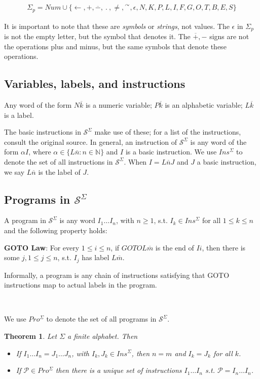 \documentclass[a4paper, 12pt]{article}
\newtheorem{theorem}{Theorem}
\newtheorem{theorem}{Theorem}
\begin{document}
\begin{align*}
    \Sigma_p = Num \cup \{ \leftarrow, +, \overline{-}, ~ . ~, \neq, {}^{\curvearrowright},
    \epsilon, N, K, P, L, I, F, G, O, T, B, E, S \}
\end{align*}

It is important to note that these are \textit{symbols} or \textit{strings}, not
values. The $\epsilon$ in $\Sigma_p$ is not the empty letter, but the symbol
that denotes it. The $\overline{+}, -$ signs are not the operations plus and
minus, but the same symbols that denote these operations. 

\subsection{Variables, labels, and instructions}

Any word of the form $N \overline{k}$ is a numeric variable; $P \overline{k}$ is
an alphabetic variable; $L \overline{k}$ is a label.

The basic instructions in $\mathcal{S}^{\Sigma}$ make use of these; for a list
of the instructions, consult the original source. In general, an instruction of
$\mathcal{S}^{\Sigma}$ is any word of the form $\alpha I$, where $\alpha \in \{L
\overline{n}: n \in \mathbb{N}\}$ and $I$ is a basic instruction. We use
$Ins^{\Sigma}$ to denote the set of all instructions in $\mathcal{S}^{\Sigma}$.
When $I = L \overline{n} J$ and $J$ a basic instruction, we say $L \overline{n}$
is the label of $J$.

\subsection{Programs in $\mathcal{S}^{\Sigma}$}

A program in $\mathcal{S}^{\Sigma}$ is any word $I_1 \ldots I_n$, with $n \geq
1$, s.t. $I_k \in Ins^{\Sigma}$ for all $1 \leq k \leq n$ and the following
property holds:

\textbf{GOTO Law}: For every $1 \leq i \leq n$, if $GOTOL \overline{m}$ is
the end of $Ii$, then there is some $j, 1 \leq j \leq n$, s.t. $I_j$ has label
$L \overline{m}$.

Informally, a program is any chain of instructions satisfying that GOTO
instructions map to actual labels in the program.

~ 

We use $Pro^{\Sigma}$ to denote the set of all programs in
$\mathcal{S}^{\Sigma}$.

\begin{theorem}
    Let $\Sigma$ a finite alphabet. Then 

    \begin{itemize}
        \item If $I_1 \ldots I_n = J_1 \ldots J_n$, with $I_k, J_k \in
            Ins^{\Sigma}$, then $n = m$ and $I_k = J_k$ for all $k$.
        \item If $\mathcal{P} \in Pro^{\Sigma}$ then there is a unique set of
            instructions $I_1 \ldots I_n$ s.t. $\mathcal{P} = I_n \ldots I_n$.
    \end{itemize}
\end{theorem}
\end{document}
